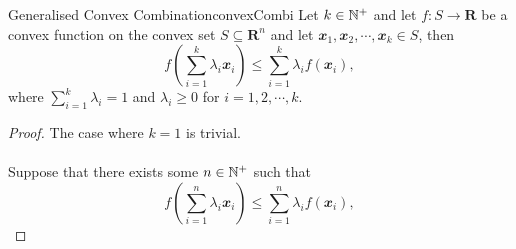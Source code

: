 \documentclass[math]{amznotes}
\theoremstyle{remark}
\begin{document}
\begin{probox}{Generalised Convex Combination}{convexCombi}
    Let $k \in \mathbb{N}^+$ and let $f \colon S \to \mathbf{R}$ be a convex function on the convex set $S \subseteq \mathbf{R}^n$ and let $\mathbfit{x}_1, \mathbfit{x}_2, \cdots, \mathbfit{x}_k \in S$, then 
    \begin{equation*}       
        f\left(\sum_{i = 1}^{k}\lambda_i\mathbfit{x}_i\right) \leq \sum_{i = 1}^{k}\lambda_i f(\mathbfit{x}_i),
    \end{equation*}     
    where $\sum_{i = 1}^{k}\lambda_i = 1$ and $\lambda_i \geq 0$ for $i = 1, 2, \cdots, k$.
    \tcblower
    \begin{proof}
        The case where $k = 1$ is trivial.
        \\\\
        Suppose that there exists some $n \in \mathbb{N}^+$ such that
        \begin{equation*}
            f\left(\sum_{i = 1}^{n}\lambda_i\mathbfit{x}_i\right) \leq \sum_{i = 1}^{n}\lambda_i f(\mathbfit{x}_i),
        \end{equation*}
    \end{proof}
\end{probox}
\end{document}
